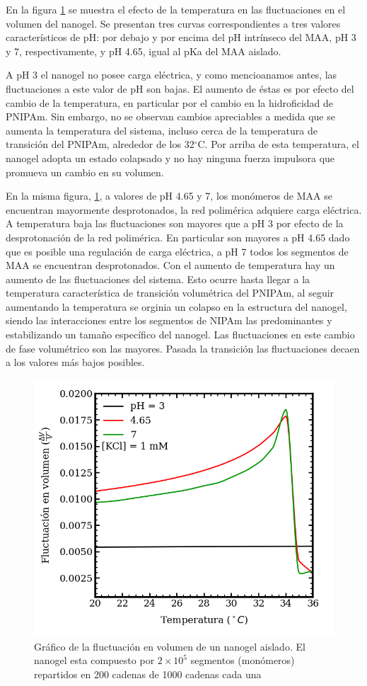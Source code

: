 	
	En la figura \ref{fig:mc:fluct-T} se muestra el efecto de la temperatura en las fluctuaciones en el volumen del nanogel. Se presentan tres curvas correspondientes a tres valores caracter\'isticos de pH: por debajo y por encima del pH intr\'inseco del MAA, pH 3 y 7, respectivamente, y pH 4.65, igual al pKa del MAA aislado.
	
	A pH 3 el nanogel no posee carga el\'ectrica, y como mencioanamos antes, las fluctuaciones a este valor de pH son bajas. El aumento de \'estas es por efecto del cambio de la temperatura, en particular por el cambio en la hidroficidad de PNIPAm. Sin embargo, no se observan cambios apreciables a medida que se aumenta la temperatura del sistema, incluso cerca de la temperatura de transici\'on del PNIPAm, alrededor de los 32$^\circ$C. Por arriba de esta temperatura, el nanogel adopta un estado colapsado y no hay ninguna fuerza impulsora que promueva un cambio en su volumen.
	
	En la misma figura, \ref{fig:mc:fluct-T}, a valores de pH 4.65 y 7, los mon\'omeros de MAA se encuentran mayormente desprotonados, la red polim\'erica adquiere carga el\'ectrica. 
	A temperatura baja las fluctuaciones son mayores que a pH 3 por efecto de la desprotonaci\'on de la red polim\'erica. En particular son mayores a pH 4.65 dado que es posible una regulaci\'on de carga el\'ectrica, a pH 7 todos los segmentos de MAA se encuentran desprotonados.
	Con el aumento de temperatura hay un aumento de las fluctuaciones del sistema.
	Esto ocurre hasta llegar a la temperatura caracter\'istica de transici\'on volum\'etrica del PNIPAm, al seguir aumentando la temperatura se orginia un colapso en la estructura del nanogel, siendo las interacciones entre los segmentos de NIPAm las predominantes y estabilizando un tama\~no espec\'ifico del nanogel.
	Las fluctuaciones en este cambio de fase volum\'etrico son las mayores. Pasada la transici\'on las fluctuaciones decaen a los valores m\'as bajos posibles.
	
	
	
	\begin{figure}
		\centering
		\includegraphics[width=0.45\linewidth]{Figures/graph-mc/fluct-T.png}
		\caption{Gr\'afico de la fluctuaci\'on en volumen de un nanogel aislado. El nanogel esta compuesto por $2\times 10^5$ segmentos (mon\'omeros) repartidos en 200 cadenas de 1000 cadenas cada una}
		\label{fig:mc:fluct-T}
	\end{figure}
	
